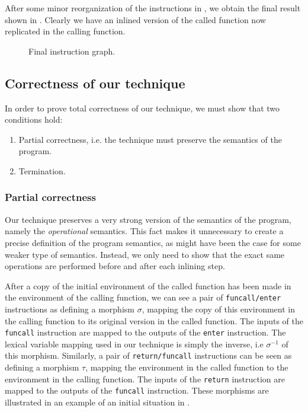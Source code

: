 After some minor reorganization of the instructions in ,
we obtain the final result shown in .  Clearly we have an
inlined version of the called function now replicated in the calling
function.

\begin{figure}
\begin{center}
\end{center}
\caption{\label{fig47}
Final instruction graph.}
\end{figure}

\subsection{Correctness of our technique}

In order to prove total correctness of our technique, we must show
that two conditions hold:

\begin{enumerate}
\item Partial correctness, i.e. the technique must preserve the
  semantics of the program.
\item Termination.
\end{enumerate}

\subsubsection{Partial correctness}

Our technique preserves a very strong version of the semantics of the
program, namely the \emph{operational} semantics.  This fact makes
it unnecessary to create a precise definition of the program
semantics, as might have been the case for some weaker type of
semantics.  Instead, we only need to show that the exact same
operations are performed before and after each inlining step.

After a copy of the initial environment of the called function has
been made in the environment of the calling function, we can see a
pair of \texttt{funcall/enter} instructions as defining a morphism
$\sigma$, mapping the copy of this environment in the calling function
to its original version in the called function.  The inputs of the
\texttt{funcall} instruction are mapped to the outputs of the
\texttt{enter} instruction.  The lexical variable mapping used in our
technique is simply the inverse, i.e $\sigma^{-1}$ of this morphism.
Similarly, a pair of \texttt{return/funcall} instructions can be seen
as defining a morphism $\tau$, mapping the environment in the called
function to the environment in the calling function.  The inputs of
the \texttt{return} instruction are mapped to the outputs of the
\texttt{funcall} instruction.  These morphisms are illustrated in an
example of an initial situation in .

